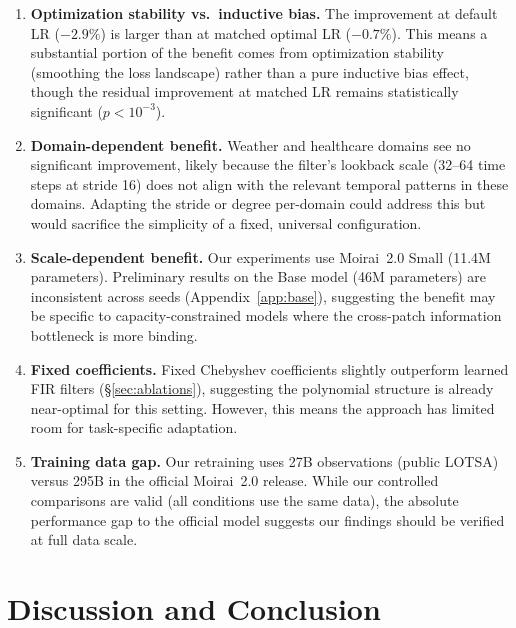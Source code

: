 \documentclass{article}
\begin{document}
\begin{enumerate}
    \item \textbf{Optimization stability vs.\ inductive bias.} The improvement at default LR ($-2.9\%$) is larger than at matched optimal LR ($-0.7\%$). This means a substantial portion of the benefit comes from optimization stability (smoothing the loss landscape) rather than a pure inductive bias effect, though the residual improvement at matched LR remains statistically significant ($p < 10^{-3}$).

    \item \textbf{Domain-dependent benefit.} Weather and healthcare domains see no significant improvement, likely because the filter's lookback scale (32--64 time steps at stride 16) does not align with the relevant temporal patterns in these domains. Adapting the stride or degree per-domain could address this but would sacrifice the simplicity of a fixed, universal configuration.

    \item \textbf{Scale-dependent benefit.} Our experiments use Moirai~2.0 Small (11.4M parameters). Preliminary results on the Base model (46M parameters) are inconsistent across seeds (Appendix~\ref{app:base}), suggesting the benefit may be specific to capacity-constrained models where the cross-patch information bottleneck is more binding.

    \item \textbf{Fixed coefficients.} Fixed Chebyshev coefficients slightly outperform learned FIR filters (\S\ref{sec:ablations}), suggesting the polynomial structure is already near-optimal for this setting. However, this means the approach has limited room for task-specific adaptation.

    \item \textbf{Training data gap.} Our retraining uses 27B observations (public LOTSA) versus 295B in the official Moirai~2.0 release. While our controlled comparisons are valid (all conditions use the same data), the absolute performance gap to the official model suggests our findings should be verified at full data scale.
\end{enumerate}

\section{Discussion and Conclusion}
\label{sec:conclusion}
\end{document}
